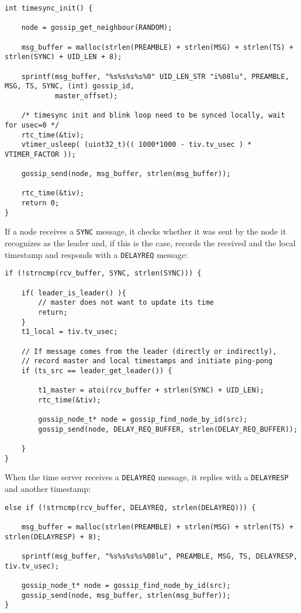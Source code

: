 \documentclass[11pt,
  a4paper,
  ngerman,
  BCOR=7mm
]{scrartcl}
\begin{document}
\begin{lstlisting}
int timesync_init() {

    node = gossip_get_neighbour(RANDOM);

    msg_buffer = malloc(strlen(PREAMBLE) + strlen(MSG) + strlen(TS) + strlen(SYNC) + UID_LEN + 8);

    sprintf(msg_buffer, "%s%s%s%s%0" UID_LEN_STR "i%08lu", PREAMBLE, MSG, TS, SYNC, (int) gossip_id,
            master_offset);

    /* timesync init and blink loop need to be synced locally, wait for usec=0 */
    rtc_time(&tiv);
    vtimer_usleep( (uint32_t)(( 1000*1000 - tiv.tv_usec ) * VTIMER_FACTOR ));

    gossip_send(node, msg_buffer, strlen(msg_buffer));

    rtc_time(&tiv);
    return 0;
}
\end{lstlisting}

If a node receives a \lstinline!SYNC! message, it checks whether it was
sent by the node it recognizes as the leader and, if this is the case,
records the received and the local timestamp and responds with
a \lstinline!DELAYREQ! message:

\begin{lstlisting}
if (!strncmp(rcv_buffer, SYNC, strlen(SYNC))) {

    if( leader_is_leader() ){
        // master does not want to update its time
        return;
    }
    t1_local = tiv.tv_usec;

    // If message comes from the leader (directly or indirectly),
    // record master and local timestamps and initiate ping-pong
    if (ts_src == leader_get_leader()) {

        t1_master = atoi(rcv_buffer + strlen(SYNC) + UID_LEN);
        rtc_time(&tiv);

        gossip_node_t* node = gossip_find_node_by_id(src);
        gossip_send(node, DELAY_REQ_BUFFER, strlen(DELAY_REQ_BUFFER));

    }
}
\end{lstlisting}

\newpage

When the time server receives a \lstinline!DELAYREQ! message, it replies
with a \lstinline!DELAYRESP! and another timestamp:

\begin{lstlisting}
else if (!strncmp(rcv_buffer, DELAYREQ, strlen(DELAYREQ))) {

    msg_buffer = malloc(strlen(PREAMBLE) + strlen(MSG) + strlen(TS) + strlen(DELAYRESP) + 8);

    sprintf(msg_buffer, "%s%s%s%s%08lu", PREAMBLE, MSG, TS, DELAYRESP, tiv.tv_usec);

    gossip_node_t* node = gossip_find_node_by_id(src);
    gossip_send(node, msg_buffer, strlen(msg_buffer));
}
\end{lstlisting}
\end{document}
